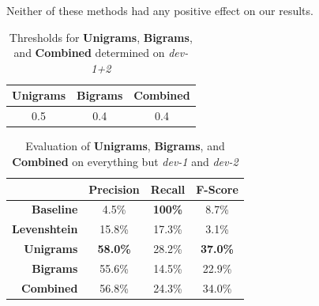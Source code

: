 \documentclass[a4paper,10pt]{scrartcl}
\theoremstyle{style}
\begin{document}
Neither of these methods had any positive effect on our results.

\begin{table}
\begin{center}
\begin{tabular}{|c|c|c|}
\textbf{Unigrams} & \textbf{Bigrams} & \textbf{Combined} \\
\hline
0.5 & 0.4 & 0.4
\end{tabular}
\end{center}
\caption{Thresholds for \textbf{Unigrams}, \textbf{Bigrams}, and \textbf{Combined} determined on \textit{dev-1+2}}
\label{thresholds}
\end{table}

\begin{table}
\begin{center}
\begin{tabular}{|r|c|c|c|}
\hline
& Precision & Recall & F-Score \\
\hline
\textbf{Baseline} & 4.5\% & \textbf{100\%} & 8.7\% \\
\hline
\textbf{Levenshtein} & 15.8\% & 17.3\% & 3.1\% \\
\hline
\textbf{Unigrams} & \textbf{58.0\%} & 28.2\% & \textbf{37.0\%} \\
\hline
\textbf{Bigrams} & 55.6\% & 14.5\% & 22.9\% \\
\hline
\textbf{Combined} & 56.8\% & 24.3\% & 34.0\% \\
\hline
\end{tabular}
\end{center}
\caption{Evaluation of \textbf{Unigrams}, \textbf{Bigrams}, and \textbf{Combined} on everything but \textit{dev-1} and \textit{dev-2}}
\label{eval_redundancy}
\end{table}




\end{document}
